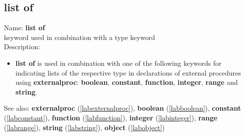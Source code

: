 \subsection{list of}
\label{lablistof}
\noindent Name: \textbf{list of}\\
\phantom{aaa}keyword used in combination with a type keyword\\[0.2cm]
\noindent Description: \begin{itemize}

\item \textbf{list of} is used in combination with one of the following keywords for
   indicating lists of the respective type in declarations of external
   procedures using \textbf{externalproc}: \textbf{boolean}, \textbf{constant}, \textbf{function},
   \textbf{integer}, \textbf{range} and \textbf{string}.
\end{itemize}
See also: \textbf{externalproc} (\ref{labexternalproc}), \textbf{boolean} (\ref{labboolean}), \textbf{constant} (\ref{labconstant}), \textbf{function} (\ref{labfunction}), \textbf{integer} (\ref{labinteger}), \textbf{range} (\ref{labrange}), \textbf{string} (\ref{labstring}), \textbf{object} (\ref{labobject})
